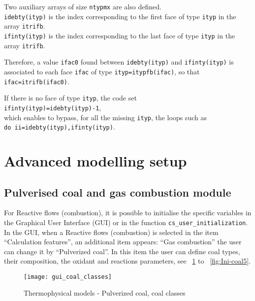 Two auxiliary arrays of size \texttt{ntypmx} are also defined.\\
\texttt{idebty(ityp)} is the index
corresponding to the first
face of type \texttt{ityp} in the array \texttt{itrifb}.\\
\texttt{ifinty(ityp)} is the index
corresponding to the last
face of type \texttt{ityp} in the array \texttt{itrifb}.

Therefore, a value \texttt{ifac0} found between \texttt{idebty(ityp)} and
\texttt{ifinty(ityp)} is associated to each face \texttt{ifac} of type
\texttt{ityp=itypfb(ifac)}, so that \texttt{ifac=itrifb(ifac0)}.

If there is no face of type \texttt{ityp}, the code set \\
\texttt{ifinty(ityp)=idebty(ityp)-1},\\
which enables to bypass, for all the missing \texttt{ityp}, the loops such as \\
\texttt{do ii=idebty(ityp),ifinty(ityp)}.


\section{Advanced modelling setup}

\subsection[Pulverised coal and gas combustion module]
{Pulverised coal and gas combustion module}
\label{sec:Ini-coal}
For Reactive flows (combustion), it is possible to initialise the specific variables in the Graphical User Interface (GUI) or in the function
\texttt{cs\_user\_initialization}. In the GUI, when a Reactive flows (combustion) is selected in the item ``Calculation features'', an additional item appears: ``Gas combustion'' the user can change it by ``Pulverized coal''. In this item the user can define coal types, their composition, the oxidant and reactions parameters, see \figurename~\ref{fig:Ini-coal1} to \figurename~\ref{fig:Ini-coal5}.

\begin{figure}[!ht]
\begin{center}
\texttt{[image: gui\_coal\_classes]}
\caption{Thermophysical models - Pulverized coal, coal classes}
\label{fig:Ini-coal1}
\end{center}
\end{figure}

